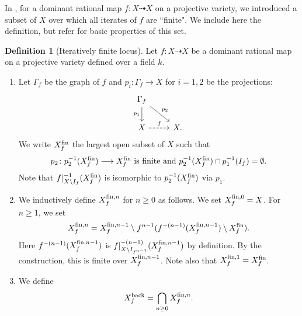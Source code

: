 \documentclass[12pt]{amsart}
\theoremstyle{plain}
\theoremstyle{definition}
\newtheorem{definition}[theorem]{Definition}
\numberwithin{equation}{section}
\newcommand{\G}{\Gamma}
\begin{document}
In \cite[Appendix B.1]{matsuzawa-note-ad-dls}, for a dominant rational map $f \colon X \dashrightarrow X$
on a projective variety, we introduced a subset of $X$ over which all iterates of $f$ are ``finite".
We include here the definition, but
refer \cite[Appendix B.1]{matsuzawa-note-ad-dls} for basic properties of this set.
\begin{definition}[Iteratively finite locus]
Let $f \colon X \dashrightarrow X$ be a dominant rational map on a projective variety 
defined over a field $k$.
\begin{enumerate}
\item
Let $\G_{f}$ be the graph of $f$ and $p_{i} \colon \G_{f} \longrightarrow X$ for $i=1,2$ be the projections:
\begin{equation}
\begin{tikzcd}
\G_{f} \arrow[d,"p_{1}", swap] \arrow[rd, "p_{2}"] & \\
X \arrow[r, "f", dashed]& X.
\end{tikzcd}
\end{equation}
We write $X_{f}^{\rm fin}$ the largest open subset of $X$ such that
\begin{align}
\text{$p_{2} \colon p_{2}^{-1}(X_{f}^{\rm fin}) \longrightarrow X_{f}^{\rm fin}$ is finite 
and $p_{2}^{-1}(X_{f}^{\rm fin})\cap p_{1}^{-1}(I_{f}) =  \emptyset$.}
\end{align}
Note that $f|_{X \setminus I_{f}}^{-1}(X_{f}^{\rm fin})$ is isomorphic to $p_{2}^{-1}(X_{f}^{\rm fin})$
via $p_{1}$.
\item
We inductively define $X_{f}^{{\rm fin}, n}$ for $n \geq 0$ as follows.
We set $X_{f}^{{\rm fin}, 0} = X$.
For $n \geq 1$, we set
\begin{align}
X_{f}^{{\rm fin}, n} = X_{f}^{{\rm fin}, n-1} \setminus f^{n-1}(f^{-(n-1)}(X_{f}^{{\rm fin}, n-1}) \setminus X_{f}^{{\rm fin}}).
\end{align}
Here $f^{-(n-1)}(X_{f}^{{\rm fin}, n-1})$ is $f|_{X \setminus I_{f^{n-1}}}^{-(n-1)}(X_{f}^{{\rm fin}, n-1})$ by definition.
By the construction, this is finite over $X_{f}^{{\rm fin}, n-1}$.
Note also that $X_{f}^{{\rm fin}, 1} = X_{f}^{{\rm fin}}$.
\item
We define
\begin{align}
X_{f}^{\rm back} = \bigcap_{n \geq 0} X_{f}^{{\rm fin}, n}.
\end{align}
\end{enumerate}
\end{definition}
\end{document}
